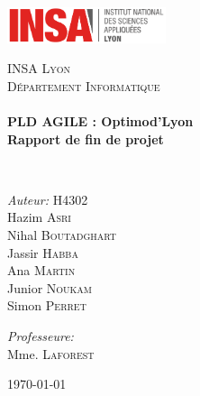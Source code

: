 \begin{titlepage}
\begin{center}

\includegraphics[width=0.35\textwidth]{./logo}~\\[2cm]

\vspace{3cm}

\textsc{\LARGE INSA Lyon}\\[0.5cm]
\textsc{\Large Département Informatique}\\[0.5cm]

\HRule \\[0.4cm]

{\huge \bfseries PLD AGILE : Optimod'Lyon\\
 Rapport de fin de projet\\[0.4cm] }

\HRule \\[1.5cm]

\begin{minipage}{0.4\textwidth}
\begin{flushleft} \large
\emph{Auteur:} H4302\\
Hazim \textsc{Asri}\\
Nihal \textsc{Boutadghart}\\
Jassir \textsc{Habba}\\
Ana \textsc{Martin}\\
Junior \textsc{Noukam}\\
Simon \textsc{Perret}\\
\end{flushleft}
\end{minipage}
\begin{minipage}{0.4\textwidth}
\begin{flushright} \large
\emph{Professeure:} \\
Mme. \textsc{Laforest}\\
\end{flushright}
\end{minipage}

\vfill

{\large \today}

\end{center}
\end{titlepage}